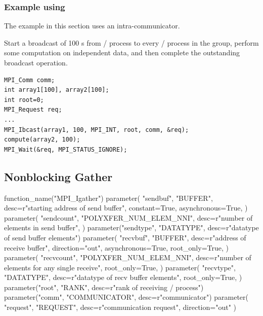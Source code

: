 \subsubsection{Example using \texorpdfstring{}{MPI\_IBCAST}}

The example in this section uses an intra-communicator.

\begin{example}
\label{nbcoll-exZ}
%
Start a broadcast of 100 s from \MPI/ process  to every \MPI/ process in the
group, perform some computation on independent data, and then complete
the outstanding broadcast operation.

\begin{lstlisting}[language={[MPI]C}]
MPI_Comm comm;
int array1[100], array2[100];
int root=0;
MPI_Request req;
...
MPI_Ibcast(array1, 100, MPI_INT, root, comm, &req);
compute(array2, 100);
MPI_Wait(&req, MPI_STATUS_IGNORE);
\end{lstlisting}
\end{example}


\subsection{Nonblocking Gather}
\label{sec:nbcoll-igather}

\begin{mpi-binding}
    function_name("MPI_Igather")
    parameter(
        "sendbuf",
        "BUFFER",
        desc=r"starting address of send buffer",
        constant=True,
        asynchronous=True,
    )
    parameter(
        "sendcount",
        "POLYXFER_NUM_ELEM_NNI",
        desc=r"number of elements in send buffer",
    )
    parameter("sendtype", "DATATYPE", desc=r"datatype of send buffer elements")
    parameter(
        "recvbuf",
        "BUFFER",
        desc=r"address of receive buffer",
        direction="out",
        asynchronous=True,
        root_only=True,
    )
    parameter(
        "recvcount",
        "POLYXFER_NUM_ELEM_NNI",
        desc=r"number of elements for any single receive",
        root_only=True,
    )
    parameter(
        "recvtype",
        "DATATYPE",
        desc=r"datatype of recv buffer elements",
        root_only=True,
    )
    parameter("root", "RANK", desc=r"rank of receiving \MPI/ process")
    parameter("comm", "COMMUNICATOR", desc=r"communicator")
    parameter(
        "request", "REQUEST", desc=r"communication request", direction="out"
    )
\end{mpi-binding}

